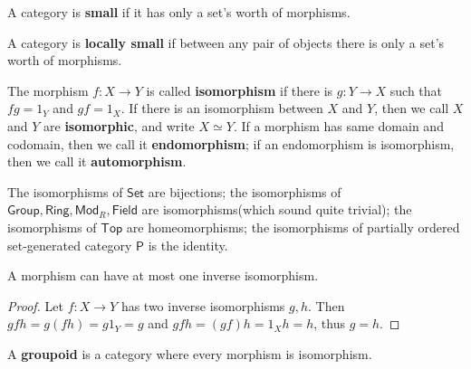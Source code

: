 \begin{defn} A category is \textbf{small} if it has only a set's worth of morphisms.
\end{defn}

\begin{defn} A category is \textbf{locally small} if between any pair of objects there is only a set's worth of morphisms.
\end{defn}
\begin{defn} The morphism $f:X\rightarrow Y$ is called \textbf{isomorphism} if there is $g:Y\rightarrow X$ such that $fg=1_Y$ and $gf=1_X$. If there is an isomorphism between $X$ and $Y$, then we call $X$ and $Y$ are \textbf{isomorphic}, and write $X\simeq Y$. If a morphism has same domain and codomain, then we call it \textbf{endomorphism}; if an endomorphism is isomorphism, then we call it \textbf{automorphism}.
\end{defn}

\begin{exmp}
The isomorphisms of $\mathsf{Set}$ are bijections; the isomorphisms of $\mathsf{Group},\mathsf{Ring},\mathsf{Mod}_R,\mathsf{Field}$ are isomorphisms(which sound quite trivial); the isomorphisms of $\mathsf{Top}$ are homeomorphisms; the isomorphisms of partially ordered set-generated category $\mathsf{P}$ is the identity.
\end{exmp}

\begin{lemma} A morphism can have at most one inverse isomorphism.
\end{lemma}
\begin{proof} Let $f:X\rightarrow Y$ has two inverse isomorphisms $g,h$. Then $gfh=g(fh)=g1_Y=g$ and $gfh=(gf)h=1_X h=h$, thus $g=h$.
\end{proof}

\begin{defn} A \textbf{groupoid} is a category where every morphism is isomorphism.
\end{defn}


